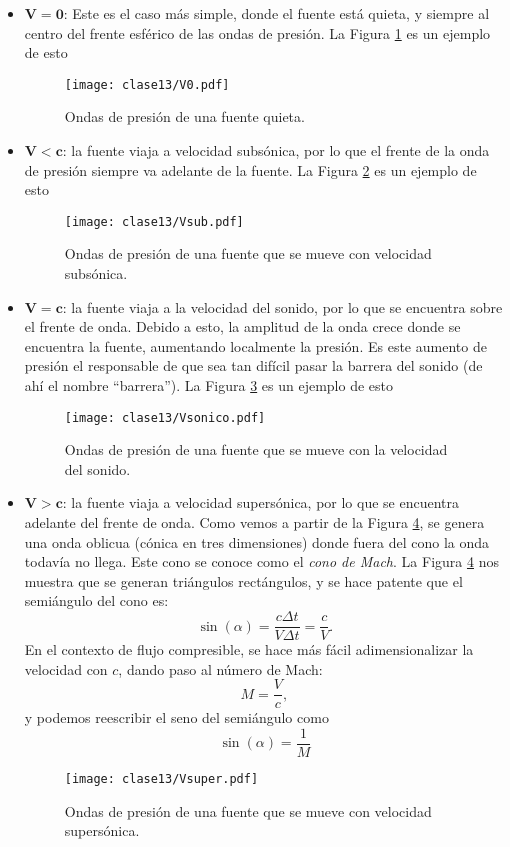 \begin{itemize}
\item $\mathbf{V=0}$: Este es el caso más simple, donde el fuente está quieta, y siempre al centro del frente esférico de las ondas de presión. 
La Figura \ref{fig:V0} es un ejemplo de esto
%
\begin{figure}[h!]
\centering
\texttt{[image: clase13/V0.pdf]}
\caption{Ondas de presión de una fuente quieta.}
\label{fig:V0}
\end{figure}
%
\item $\mathbf{V<c}$: la fuente viaja a velocidad subsónica, por lo que el frente de la onda de presión siempre va adelante de la fuente.
La Figura \ref{fig:Vsub} es un ejemplo de esto
%
\begin{figure}[h!]
\centering
\texttt{[image: clase13/Vsub.pdf]}
\caption{Ondas de presión de una fuente que se mueve con velocidad subsónica.}
\label{fig:Vsub}
\end{figure}
%
\item $\mathbf{V=c}$: la fuente viaja a la velocidad del sonido, por lo que se encuentra sobre el frente de onda.
Debido a esto, la amplitud de la onda crece donde se encuentra la fuente, aumentando localmente la presión.
Es este aumento de presión el responsable de que sea tan difícil pasar la barrera del sonido (de ahí el nombre ``barrera'').
La Figura \ref{fig:Vsonico} es un ejemplo de esto
%
\begin{figure}[h!]
\centering
\texttt{[image: clase13/Vsonico.pdf]}
\caption{Ondas de presión de una fuente que se mueve con la velocidad del sonido.} 
\label{fig:Vsonico}
\end{figure}
%
\item $\mathbf{V>c}$: la fuente viaja a velocidad supersónica, por lo que se encuentra adelante del frente de onda.
Como vemos a partir de la Figura \ref{fig:Vsuper}, se genera una onda oblicua (cónica en tres dimensiones) donde fuera del cono la onda todavía no llega.
Este cono se conoce como el \emph{cono de Mach}.
La Figura \ref{fig:Vsuper} nos muestra que se generan triángulos rectángulos, y se hace patente que el semiángulo del cono es:
%
\begin{equation}
\sin (\alpha) = \frac{c\Delta t}{V\Delta t} = \frac{c}{V}.
\end{equation}
%
En el contexto de flujo compresible, se hace más fácil adimensionalizar la velocidad con $c$, dando paso al número de Mach:
%
\begin{equation}
M = \frac{V}{c},
\end{equation}
%
y podemos reescribir el seno del semiángulo como
%
\begin{equation}
\sin(\alpha)= \frac{1}{M}
\end{equation}
%
\begin{figure}[h!]
\centering
\texttt{[image: clase13/Vsuper.pdf]}
\caption{Ondas de presión de una fuente que se mueve con velocidad supersónica.} 
\label{fig:Vsuper}
\end{figure}
\end{itemize}


